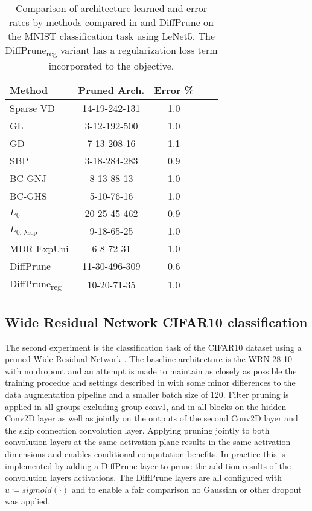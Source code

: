 \documentclass[final,1p,times]{elsarticle}
\begin{document}
\begin{table}[t]
\centering
\begin{tabular}{l c c c c } 
\toprule
Method & Pruned Arch. & Error \% \\ [0.5ex] 
\midrule
Sparse VD \cite{pmlr-v70-molchanov17a} & 14-19-242-131 & 1.0 \\
GL \cite{NIPS2016_6504} & 3-12-192-500 & 1.0 \\
GD \cite{srinivas2016generalized} & 7-13-208-16 & 1.1 \\
SBP \cite{NIPS2017_7254} & 3-18-284-283 & 0.9 \\
BC-GNJ \cite{NIPS2017_6921} & 8-13-88-13 & 1.0 \\
BC-GHS \cite{NIPS2017_6921} & 5-10-76-16 & 1.0 \\
$L_0$ \cite{louizos2018learning} & 20-25-45-462 & 0.9 \\
$L_{0, \, \lambda \text{sep}}$ \cite{louizos2018learning} & 9-18-65-25 & 1.0 \\
MDR-ExpUni \cite{Huang_2020_CVPR_Workshops} & 6-8-72-31 & 1.0 \\
\midrule
DiffPrune & 11-30-496-309 & 0.6 \\ 
DiffPrune\textsubscript{reg} & 10-20-71-35 & 1.0 \\
\bottomrule
\end{tabular}
\caption{\label{tab:lenet5}Comparison of architecture learned and error rates by methods compared in \cite{louizos2018learning, Huang_2020_CVPR_Workshops} and DiffPrune on the MNIST classification task using LeNet5. The DiffPrune\textsubscript{reg} variant has a regularization loss term incorporated to the objective.} 
\end{table}

\subsection{Wide Residual Network CIFAR10 classification}

The second experiment is the classification task of the CIFAR10 dataset using a pruned Wide Residual Network \cite{BMVC2016_87}. The baseline architecture is the WRN-28-10 with no dropout and an attempt is made to maintain as closely as possible the training procedue and settings described in \cite{BMVC2016_87} with some minor differences to the data augmentation pipeline and a smaller batch size of 120. Filter pruning is applied in all groups excluding group conv1, and in all blocks on the hidden Conv2D layer as well as jointly on the outputs of the second Conv2D layer and the skip connection convolution layer. Applying pruning jointly to both convolution layers at the same activation plane results in the same activation dimensions and enables conditional computation benefits. In practice this is implemented by adding a DiffPrune layer to prune the addition results of the convolution layers activations. The DiffPrune layers are all configured with $u \coloneqq sigmoid ( \cdot )$ and to enable a fair comparison no Gaussian or other dropout was applied. 
\end{document}
